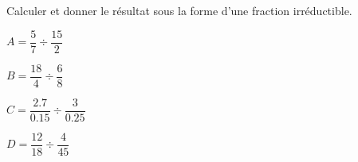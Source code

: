 \begin{exercice*}
    Calculer et donner le résultat sous la forme d'une fraction irréductible.
    \begin{multicols}{2}
        \begin{spacing}{2}
            \begin{list}{}{}
                \item $A=\dfrac{5}{7}\div\dfrac{15}{2}$
                \item $B=\dfrac{18}{4}\div\dfrac{6}{8}$
                \item $C=\dfrac{\num{2.7}}{\num{0.15}}\div\dfrac{3}{\num{0.25}}$
                \item $D=\dfrac{12}{18}\div\dfrac{4}{45}$
            \end{list}
        \end{spacing}
    \end{multicols}
\end{exercice*}
